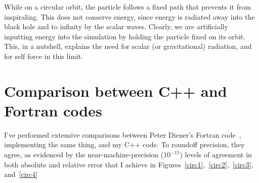 While on a circular orbit, the particle follows a fixed path that prevents it from inspiraling. This does not conserve energy, since energy is radiated away into the black hole and to infinity by the scalar waves. Clearly, we are artificially inputting energy into the simulation by holding the particle fixed on its orbit. This, in a nutshell, explains the need for scalar (or gravitational) radiation, and for self force in this limit. 


\section{Comparison between C++ and Fortran codes}

I've performed extensive comparisons between Peter Diener's Fortran code~\cite{heffernan_ottewil_wardell_modesum_basisForCode}, implementing the same thing, and my C++ code. To roundoff precision, they agree, as evidenced by the near-machine-precision ($10^{-15}$) levels of agreement in both absolute and relative error that I achieve in Figures~\ref{circ1},~\ref{circ2},~\ref{circ3}, and~\ref{circ4}

